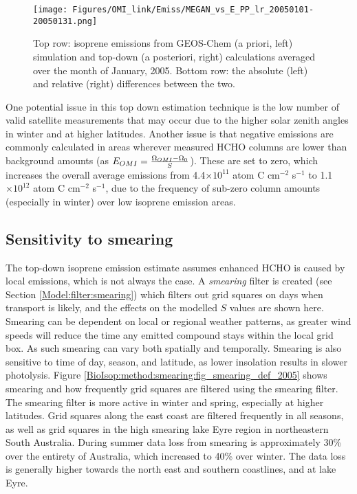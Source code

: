     
    
    \begin{figure}
      \texttt{[image: Figures/OMI\_link/Emiss/MEGAN\_vs\_E\_PP\_lr\_20050101-20050131.png]}
      \caption{%
        Top row: isoprene emissions from GEOS-Chem (a priori, left) simulation and top-down (a posteriori, right) calculations averaged over the month of January, 2005.
        Bottom row: the absolute (left) and relative (right) differences between the two.
      }
      \label{BioIsop:method:calculation:fig_E_isop_200501}
    \end{figure}
    
    
    One potential issue in this top down estimation technique is the low number of valid satellite measurements that may occur due to the higher solar zenith angles in winter and at higher latitudes.
    Another issue is that negative emissions are commonly calculated in areas wherever measured HCHO columns are lower than background amounts (as $E_{OMI} = \frac{\Omega_{OMI} - \Omega_0}{S}$).
    These are set to zero, which increases the overall average emissions from 4.4$\times 10^{11}$ atom C cm$^{-2}$ s$^{-1}$ to 1.1$\times 10^{12}$ atom C cm$^{-2}$ s$^{-1}$, due to the frequency of sub-zero column amounts (especially in winter) over low isoprene emission areas.
    
    
  \subsection{Sensitivity to smearing}
  \label{BioIsop:method:smearing}
    
    The top-down isoprene emission estimate assumes enhanced HCHO is caused by local emissions, which is not always the case.
    A \textit{smearing} filter is created (see Section \ref{Model:filter:smearing}) which filters out grid squares on days when transport is likely, and the effects on the modelled $S$ values are shown here.
    Smearing can be dependent on local or regional weather patterns, as greater wind speeds will reduce the time any emitted compound stays within the local grid box.
    As such smearing can vary both spatially and temporally.
    Smearing is also sensitive to time of day, season, and latitude, as lower insolation results in slower photolysis.
    Figure \ref{BioIsop:method:smearing:fig_smearing_def_2005} shows smearing and how frequently grid squares are filtered using the smearing filter.
    The smearing filter is more active in winter and spring, especially at higher latitudes.
    Grid squares along the east coast are filtered frequently in all seasons, as well as grid squares in the high smearing lake Eyre region in northeastern South Australia.
    During summer data loss from smearing is approximately 30\% over the entirety of Australia, which increased to 40\% over winter.
    The data loss is generally higher towards the north east and southern coastlines, and at lake Eyre.
    

